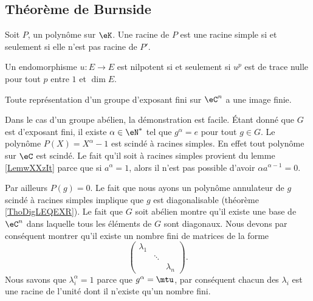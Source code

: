 \subsection{Théorème de Burnside}

\begin{lemma}       \label{LemwXXzIt}
    Soit \( P\), un polynôme sur \( \eK\). Une racine de \( P\) est une racine simple si et seulement si elle n'est pas racine de \( P'\).
\end{lemma}

\begin{lemma}
    Un endomorphisme \( u\colon E\to E\) est nilpotent si et seulement si \( u^p\) est de trace nulle pour tout \( p\) entre \( 1\) et \( \dim E\).
\end{lemma}

\begin{theorem}     \label{ThoBurnsideoPuCtS}
    Toute représentation d'un groupe d'exposant fini sur \( \eC^n\) a une image finie.
\end{theorem}

Dans le cas d'un groupe abélien, la démonstration est facile. Étant donné que \( G\) est d'exposant fini, il existe \( \alpha\in \eN^*\) tel que \( g^{\alpha}=e\) pour tout \( g\in G\). Le polynôme \( P(X)=X^{\alpha}-1\) est scindé à racines simples. En effet tout polynôme sur \( \eC\) est scindé. Le fait qu'il soit à racines simples provient du lemme \ref{LemwXXzIt} parce que si \( a^{\alpha}=1\), alors il n'est pas possible d'avoir \( \alpha a^{\alpha-1}=0\).

Par ailleurs \( P(g)=0\). Le fait que nous ayons un polynôme annulateur de \( g\) scindé à racines simples implique que \( g\) est diagonalisable (théorème \ref{ThoDigLEQEXR}). Le fait que \( G\) soit abélien montre qu'il existe une base de \( \eC^n\) dans laquelle tous les éléments de \( G\) sont diagonaux. Nous devons par conséquent montrer qu'il existe un nombre fini de matrices de la forme
\begin{equation}
    \begin{pmatrix}
        \lambda_1    &       &       \\
            &   \ddots    &       \\
            &       &   \lambda_n
    \end{pmatrix}.
\end{equation}
Nous savons que \( \lambda_i^{\alpha}=1\) parce que \( g^{\alpha}=\mtu\), par conséquent chacun des \( \lambda_i\) est une racine de l'unité dont il n'existe qu'un nombre fini.

